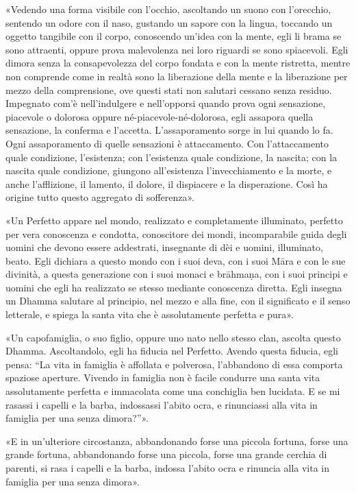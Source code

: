 «Vedendo una forma visibile con l’occhio, ascoltando un suono con
l’orecchio, sentendo un odore con il naso, gustando un sapore con la
lingua, toccando un oggetto tangibile con il corpo, conoscendo un’idea
con la mente, egli li brama se sono attraenti, oppure prova malevolenza
nei loro riguardi se sono spiacevoli. Egli dimora senza la
consapevolezza del corpo fondata e con la mente ristretta, mentre non
comprende come in realtà sono la liberazione della mente e la
liberazione per mezzo della comprensione, ove questi stati non salutari
cessano senza residuo. Impegnato com’è nell’indulgere e nell’opporsi
quando prova ogni sensazione, piacevole o dolorosa oppure
né-piacevole-né-dolorosa, egli assapora quella sensazione, la conferma e
l’accetta. L’assaporamento sorge in lui quando lo fa. Ogni assaporamento
di quelle sensazioni è attaccamento. Con l’attaccamento quale
condizione, l’esistenza; con l’esistenza quale condizione, la nascita;
con la nascita quale condizione, giungono all’esistenza l’invecchiamento
e la morte, e anche l’afflizione, il lamento, il dolore, il dispiacere e
la disperazione. Così ha origine tutto questo aggregato di sofferenza».


«Un Perfetto appare nel mondo, realizzato e completamente illuminato,
perfetto per vera conoscenza e condotta, conoscitore dei mondi,
incomparabile guida degli uomini che devono essere addestrati,
insegnante di dèi e uomini, illuminato, beato. Egli dichiara a questo
mondo con i suoi deva, con i suoi Māra e con le sue divinità, a questa
generazione con i suoi monaci e brāhmaṇa, con i suoi principi e uomini
che egli ha realizzato se stesso mediante conoscenza diretta. Egli
insegna un Dhamma salutare al principio, nel mezzo e alla fine, con il
significato e il senso letterale, e spiega la santa vita che è
assolutamente perfetta e pura».


«Un capofamiglia, o suo figlio, oppure uno nato nello stesso clan,
ascolta questo Dhamma. Ascoltandolo, egli ha fiducia nel Perfetto.
Avendo questa fiducia, egli pensa: “La vita in famiglia è affollata e
polverosa, l’abbandono di essa comporta spaziose aperture. Vivendo in
famiglia non è facile condurre una santa vita assolutamente perfetta e
immacolata come una conchiglia ben lucidata. E se mi rasassi i capelli e
la barba, indossassi l’abito ocra, e rinunciassi alla vita in famiglia
per una senza dimora?”».


«E in un’ulteriore circostanza, abbandonando forse una piccola fortuna,
forse una grande fortuna, abbandonando forse una piccola, forse una
grande cerchia di parenti, si rasa i capelli e la barba, indossa l’abito
ocra e rinuncia alla vita in famiglia per una senza dimora».


